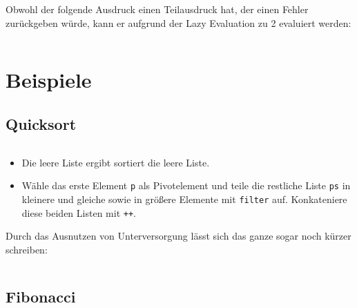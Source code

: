 \begin{beispiel}
    Obwohl der folgende Ausdruck einen Teilausdruck hat, der einen Fehler zurückgeben
    würde, kann er aufgrund der Lazy Evaluation zu 2 evaluiert werden:
    \inputminted[linenos, numbersep=5pt, tabsize=4, frame=lines, label=lazy-evaluation.hs]{haskell}{scripts/haskell/lazy-evaluation.hs}
\end{beispiel}

\section{Beispiele}
\subsection{Quicksort}%
\inputminted[linenos, numbersep=5pt, tabsize=4, frame=lines, label=qsort.hs]{haskell}{scripts/haskell/qsort.hs}

\begin{itemize}
    \item Die leere Liste ergibt sortiert die leere Liste.
    \item Wähle das erste Element \texttt{p} als Pivotelement und
          teile die restliche Liste \texttt{ps} in kleinere und 
          gleiche sowie in größere Elemente mit \texttt{filter} auf.
          Konkateniere diese beiden Listen mit \texttt{++}.
\end{itemize}

Durch das Ausnutzen von Unterversorgung lässt
sich das ganze sogar noch kürzer schreiben:

\inputminted[linenos, numbersep=5pt, tabsize=4, frame=lines, label=qsort.hs]{haskell}{scripts/haskell/qsort-unterversorg.hs}

\subsection{Fibonacci}
\inputminted[linenos, numbersep=5pt, tabsize=4, frame=lines, label=fibonacci.hs]{haskell}{scripts/haskell/fibonacci.hs}
\inputminted[linenos, numbersep=5pt, tabsize=4, frame=lines, label=fibonacci-akk.hs]{haskell}{scripts/haskell/fibonacci-akk.hs}
\inputminted[linenos, numbersep=5pt, tabsize=4, frame=lines, label=fibonacci-zip.hs]{haskell}{scripts/haskell/fibonacci-zip.hs}
\inputminted[linenos, numbersep=5pt, tabsize=4, frame=lines, label=fibonacci-pattern-matching.hs]{haskell}{scripts/haskell/fibonacci-pattern-matching.hs}

